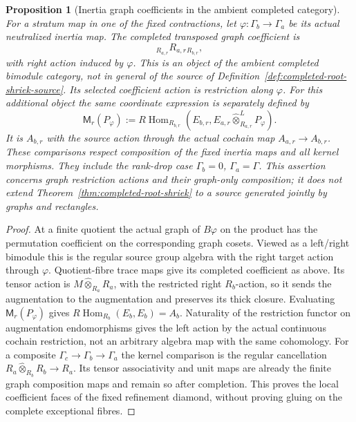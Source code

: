 \documentclass[11pt]{article}
\newtheorem{proposition}{Proposition}[section]
\theoremstyle{definition}
\theoremstyle{remark}
\newcommand{\RHom}{R\operatorname{Hom}}
\begin{document}
\begin{proposition}[Inertia graph coefficients in the ambient completed category]
\label{prop:completed-root-graphs}
For a stratum map in one of the fixed contractions, let
$\varphi:\Gamma_b\to\Gamma_a$ be its actual neutralized inertia
map.  The completed transposed graph coefficient is
\[
 {}_{R_{a,r}}R_{a,r}{}_{R_{b,r}},
\]
with right action induced by $\varphi$.  This is an object of the
ambient completed bimodule category, not in general of the source
of Definition~\ref{def:completed-root-shriek-source}.
Its selected coefficient action is restriction along $\varphi$.
For this additional object the same coordinate expression is
separately defined by
\[
 \mathsf M_r(P_\varphi):=
 \RHom_{R_{b,r}}(E_{b,r},E_{a,r}\widehat\otimes^L_{R_{a,r}}P_\varphi).
\]
It is $A_{b,r}$ with the source action through the actual cochain map
$A_{a,r}\to A_{b,r}$.  These comparisons respect composition of
the fixed inertia maps and all kernel morphisms.  They include the
rank-drop case $\Gamma_b=0$, $\Gamma_a=\Gamma$.  This assertion
concerns graph restriction actions and their graph-only composition;
it does not extend Theorem~\ref{thm:completed-root-shriek} to a source
generated jointly by graphs and rectangles.
\end{proposition}
\begin{proof}
At a finite quotient the actual graph of $B\varphi$ on the product
has the permutation coefficient on the corresponding graph cosets.
Viewed as a left/right bimodule this is the regular source group
algebra with the right target action through $\varphi$.
Quotient-fibre trace maps give its completed coefficient as above.
Its tensor action is $M\widehat\otimes_{R_a}R_a$, with the restricted
right $R_b$-action, so it sends the augmentation to the augmentation
and preserves its thick closure.  Evaluating $\mathsf M_r(P_\varphi)$ gives
$\RHom_{R_b}(E_b,E_b)=A_b$.  Naturality of the restriction functor
on augmentation endomorphisms gives the left action by the actual
continuous cochain restriction, not an arbitrary algebra map with
the same cohomology.  For a composite $\Gamma_c\to\Gamma_b\to\Gamma_a$
the kernel comparison is the regular cancellation
$R_a\widehat\otimes_{R_b}R_b\to R_a$.  Its tensor associativity
and unit maps are already the finite graph composition maps and
remain so after completion.  This proves the local coefficient
faces of the fixed refinement diamond, without proving gluing on
the complete exceptional fibres.
\end{proof}
\end{document}
